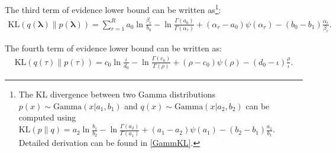 The third term of evidence lower bound can be written as\footnote{The KL divergence between two Gamma distributions $p(x) \sim \text{Gamma}(x|a_1, b_1)$ and $q(x)\sim \text{Gamma}(x|a_2, b_2)$ can be computed using $\text{KL}(p \parallel q) = a_2 \ln \frac{b_1}{b_2} - \ln\frac{\Gamma(a_2)}{\Gamma(a_1)}+(a_1 - a_2)\psi(a_1)-(b_2 - b_1)  \frac{a_1}{b_1}$. Detailed derivation can be found in \ref{GammKL}.}:
\begin{equation}
    \begin{split}
        \text{KL}(q(\boldsymbol{\lambda})\|p(\boldsymbol{\lambda}))= \sum_{r=1}^{R}
        a_0 \ln \frac{\beta_r}{b_0} - \ln\frac{\Gamma(a_0)}{\Gamma(\alpha_r)}+(\alpha_r - a_0)\psi(\alpha_r)-(b_0 - b_1)  \frac{\alpha_r}{\beta_r}.
        \label{eq:kl1}
    \end{split}
\end{equation}

The fourth term of evidence lower bound can be written as:
\begin{equation}
    \begin{split}
        \text{KL}(q(\tau)\|p(\tau))= c_0 \ln \frac{\iota}{d_0} - \ln\frac{\Gamma(c_0)}{\Gamma(\rho)}+(\rho - c_0)\psi(\rho)-(d_0 - \iota)  \frac{\rho}{\iota}.
        \label{eq:kl2}
    \end{split}
\end{equation}

